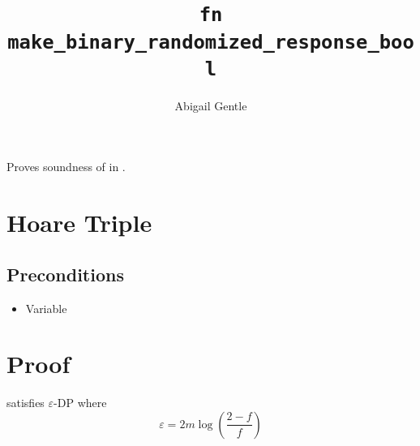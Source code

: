 \documentclass{article}
\title{\texttt{fn make\_binary\_randomized\_response\_bool}}
\author{Abigail Gentle}
\begin{document}
\maketitle

\contrib

Proves soundness of  in .

\section{Hoare Triple}
\subsection{Preconditions}
\begin{itemize}
	\item Variable 
\end{itemize}


\section{Proof}
\begin{lemma}
	 satisfies $\varepsilon$-DP where 
	\begin{equation}
		\varepsilon = 2m\log\left(\frac{2-f}{f}\right)
	\end{equation}
\end{lemma}
\end{document}
